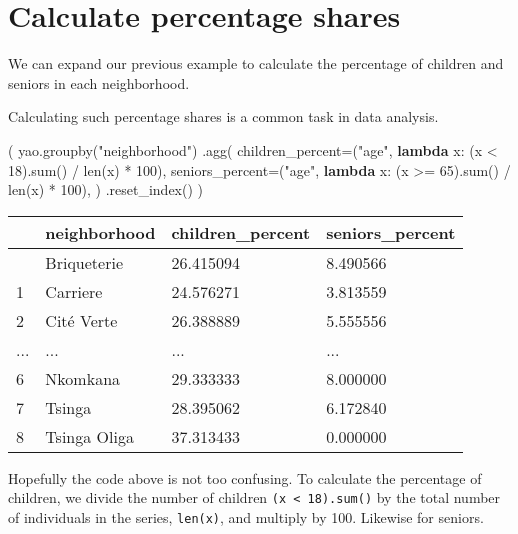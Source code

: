 \documentclass[
  letterpaper,
  DIV=11,
  numbers=noendperiod]{scrreprt}
\newenvironment{Shaded}{\begin{snugshade}}{\end{snugshade}}
\newcommand{\BuiltInTok}[1]{\textcolor[rgb]{0.00,0.23,0.31}{#1}}
\newcommand{\DecValTok}[1]{\textcolor[rgb]{0.68,0.00,0.00}{#1}}
\newcommand{\KeywordTok}[1]{\textcolor[rgb]{0.00,0.23,0.31}{\textbf{#1}}}
\newcommand{\NormalTok}[1]{\textcolor[rgb]{0.00,0.23,0.31}{#1}}
\newcommand{\OperatorTok}[1]{\textcolor[rgb]{0.37,0.37,0.37}{#1}}
\newcommand{\StringTok}[1]{\textcolor[rgb]{0.13,0.47,0.30}{#1}}
\begin{document}
\section{Calculate percentage shares}\label{calculate-percentage-shares}

We can expand our previous example to calculate the percentage of
children and seniors in each neighborhood.

Calculating such percentage shares is a common task in data analysis.

\begin{Shaded}
\begin{Highlighting}[]
\NormalTok{(}
\NormalTok{    yao.groupby(}\StringTok{"neighborhood"}\NormalTok{)}
\NormalTok{    .agg(}
\NormalTok{        children\_percent}\OperatorTok{=}\NormalTok{(}\StringTok{"age"}\NormalTok{, }\KeywordTok{lambda}\NormalTok{ x: (x }\OperatorTok{\textless{}} \DecValTok{18}\NormalTok{).}\BuiltInTok{sum}\NormalTok{() }\OperatorTok{/} \BuiltInTok{len}\NormalTok{(x) }\OperatorTok{*} \DecValTok{100}\NormalTok{),}
\NormalTok{        seniors\_percent}\OperatorTok{=}\NormalTok{(}\StringTok{"age"}\NormalTok{, }\KeywordTok{lambda}\NormalTok{ x: (x }\OperatorTok{\textgreater{}=} \DecValTok{65}\NormalTok{).}\BuiltInTok{sum}\NormalTok{() }\OperatorTok{/} \BuiltInTok{len}\NormalTok{(x) }\OperatorTok{*} \DecValTok{100}\NormalTok{),}
\NormalTok{    )}
\NormalTok{    .reset\_index()}
\NormalTok{)}
\end{Highlighting}
\end{Shaded}

\begin{longtable}[]{@{}llll@{}}
\toprule\noalign{}
& neighborhood & children\_percent & seniors\_percent \\
\midrule\noalign{}
\endhead
\bottomrule\noalign{}
\endlastfoot
0 & Briqueterie & 26.415094 & 8.490566 \\
1 & Carriere & 24.576271 & 3.813559 \\
2 & Cité Verte & 26.388889 & 5.555556 \\
... & ... & ... & ... \\
6 & Nkomkana & 29.333333 & 8.000000 \\
7 & Tsinga & 28.395062 & 6.172840 \\
8 & Tsinga Oliga & 37.313433 & 0.000000 \\
\end{longtable}

Hopefully the code above is not too confusing. To calculate the
percentage of children, we divide the number of children
\texttt{(x\ \textless{}\ 18).sum()} by the total number of individuals
in the series, \texttt{len(x)}, and multiply by 100. Likewise for
seniors.
\end{document}
